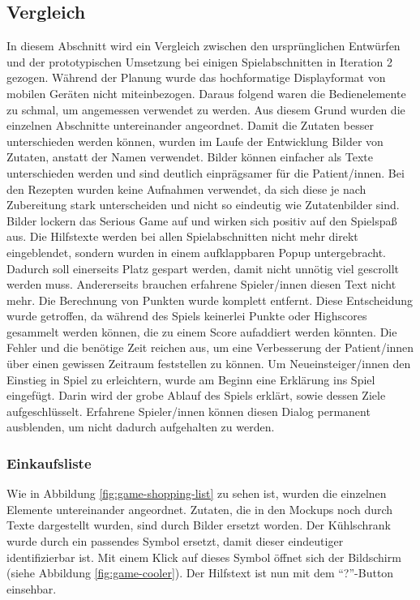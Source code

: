 \subsection{Vergleich}\label{chap:comparison}
In diesem Abschnitt wird ein Vergleich zwischen den ursprünglichen Entwürfen und der prototypischen Umsetzung bei einigen Spielabschnitten in Iteration 2 gezogen. Während der Planung wurde das hochformatige Displayformat von mobilen Geräten nicht miteinbezogen. Daraus folgend waren die Bedienelemente zu schmal, um angemessen verwendet zu werden. Aus diesem Grund wurden die einzelnen Abschnitte untereinander angeordnet. Damit die Zutaten besser unterschieden werden können, wurden im Laufe der Entwicklung Bilder von Zutaten, anstatt der Namen verwendet. Bilder können einfacher als Texte unterschieden werden und sind deutlich einprägsamer für die Patient/innen. Bei den Rezepten wurden keine Aufnahmen verwendet, da sich diese je nach Zubereitung stark unterscheiden und nicht so eindeutig wie Zutatenbilder sind. Bilder lockern das Serious Game auf und wirken sich positiv auf den Spielspaß aus. Die Hilfstexte werden bei allen Spielabschnitten nicht mehr direkt eingeblendet, sondern wurden in einem aufklappbaren Popup untergebracht. Dadurch soll einerseits Platz gespart werden, damit nicht unnötig viel gescrollt werden muss. Andererseits brauchen erfahrene Spieler/innen diesen Text nicht mehr. Die Berechnung von Punkten wurde komplett entfernt. Diese Entscheidung wurde getroffen, da während des Spiels keinerlei Punkte oder Highscores gesammelt werden können, die zu einem Score aufaddiert werden könnten. Die Fehler und die benötige Zeit reichen aus, um eine Verbesserung der Patient/innen über einen gewissen Zeitraum feststellen zu können. Um Neueinsteiger/innen den Einstieg in Spiel zu erleichtern, wurde am Beginn eine Erklärung ins Spiel eingefügt. Darin wird der grobe Ablauf des Spiels erklärt, sowie dessen Ziele aufgeschlüsselt. Erfahrene Spieler/innen können diesen Dialog permanent ausblenden, um nicht dadurch aufgehalten zu werden.

\subsubsection{Einkaufsliste}
Wie in Abbildung \ref{fig:game-shopping-list} zu sehen ist, wurden die einzelnen Elemente untereinander angeordnet. Zutaten, die in den Mockups noch durch Texte dargestellt wurden, sind durch Bilder ersetzt worden. Der Kühlschrank wurde durch ein passendes Symbol ersetzt, damit dieser eindeutiger identifizierbar ist. Mit einem Klick auf dieses Symbol öffnet sich der Bildschirm (siehe Abbildung \ref{fig:game-cooler}). Der Hilfstext ist nun mit dem \enquote{?}-Button einsehbar.

